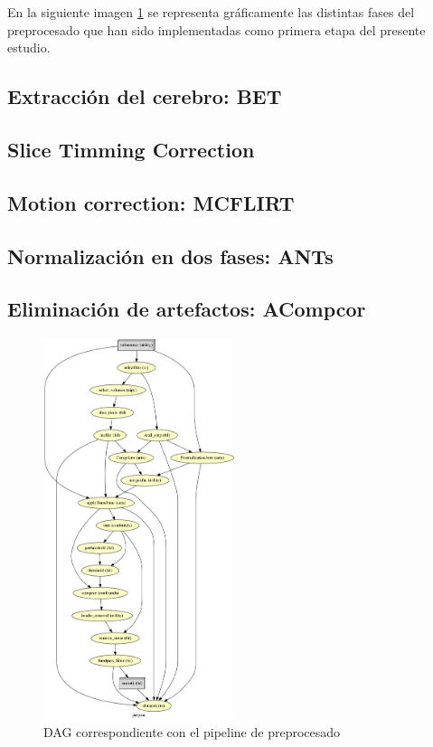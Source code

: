 En la siguiente imagen \ref{preproc:pipeline} se representa gráficamente las distintas fases del preprocesado que han sido implementadas como primera etapa del presente estudio.

\subsection{Extracción del cerebro: BET}

\subsection{Slice Timming Correction}

\subsection{Motion correction: MCFLIRT}

\subsection{Normalización en dos fases: ANTs}

\subsection{Eliminación de artefactos: ACompcor}

\begin{figure}[H]
	\centering
	\includegraphics[width=0.5\textwidth]{img/preproc/graph.png}
	\caption{DAG correspondiente con el pipeline de preprocesado}
	\label{preproc:pipeline}
\end{figure}
